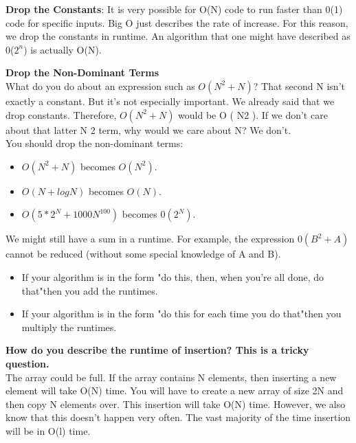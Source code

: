 \documentclass[14pt, noindent]{article}
\begin{document}
\vspace{20pt}
\textbf{Drop the Constants}: It is very possible for O(N) code to run faster than 0(1) code for
specific inputs. Big O just describes the rate of increase. For this reason, we drop the constants
in runtime. An algorithm that one might have described as 0($2^n$) is actually O(N).

\vspace{20pt}
\textbf{Drop the Non-Dominant Terms}\\
What do you do about an expression such as $O(N^2 + N)$? That second N isn't exactly a constant.
But it's not especially important. We already said that we drop constants. Therefore, $O(N^2 + N)$
would be O ( N2 ). If we don't care about that latter N 2 term, why would we care about N? We don't.\\
You should drop the non-dominant terms:\\
\begin{itemize}
\item $O(N^2 + N)$ becomes $O(N^2)$.
\item $O(N + log N)$ becomes $O(N)$.
\item $O(5* 2^N + 1000N^100)$ becomes $0(2^N)$.
\end{itemize}

\vspace{20pt}
We might still have a sum in a runtime. For example, the expression $0(B^2 + A)$ cannot be reduced
(without some special knowledge of A and B).

\vspace{20pt}
\begin{itemize}
\item If your algorithm is in the form "do this, then, when you're all done, do that"then you
add the runtimes.
\item If your algorithm is in the form "do this for each time you do that"then you multiply
the runtimes.
\end{itemize}

\vspace{20pt}
\textbf{How do you describe the runtime of insertion? This is a tricky question.}\\
The array could be full. If the array contains N elements, then inserting a new element will take
O(N) time. You will have to create a new array of size 2N and then copy N elements over. This insertion
will take O(N) time. However, we also know that this doesn't happen very often. The vast majority of
the time insertion will be in O(l) time. \\
\end{document}
